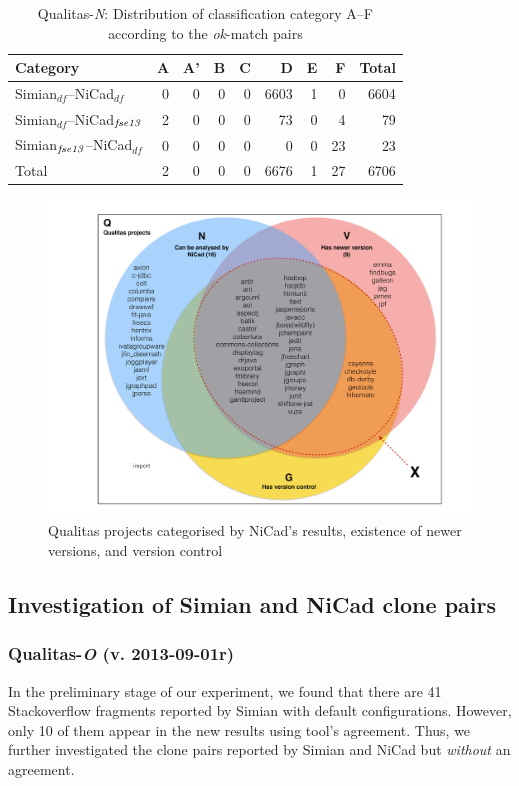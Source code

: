 \documentclass{IEEEtran}
\begin{document}
\begin{table}[H]
	\centering
	\caption{Qualitas-\textit{N}: Distribution of classification category A--F  according to the \textit{ok}-match pairs}
	\label{tab:ok_classification_new}
	\begin{tabular}{|l|r|r|r|r|r|r|r|r|}
		\hline 
		Category   																										& A   	& 	A' 	& 	B  & C	   & D   	&	E   &	F   & Total  \\
		\hline
		Simian$_{\mathrm{\textit{df}}}$--NiCad$_{\mathrm{\textit{df}}}$ & 0 & 0	& 0 & 0 & 6603 & 1 & 0 & 6604 \\
		Simian$_{\mathrm{\textit{df}}}$--NiCad$_{\textrm{\textit{fse13}}}$ 
		& 2 	& 0 	& 0 	& 0 	& 73 	 & 0 	  & 4 		&  79 \\
		Simian$_{\textrm{\textit{fse13}}}$--NiCad$_{\mathrm{\textit{df}}}$   									
		& 0 	& 0 	& 0 	& 0 	 & 0 	  & 0 		& 23 	& 23 \\
		\hline
		Total   & 2  	&   0   & 0   	&  0   &   6676   &   1   & 27  & 6706 \\
		\hline
	\end{tabular} 
\end{table}

\begin{figure}
	\centering
	\includegraphics[width=0.7\linewidth]{n+v+g}
	\caption{Qualitas projects categorised by NiCad's results, existence of newer versions, and version control}
	\label{fig:n+v+g}
\end{figure}

\subsection{Investigation of Simian and NiCad clone pairs}
\subsubsection{Qualitas-\textit{O} (v. 2013-09-01r)}
In the preliminary stage of our experiment, we found that there are 41 Stackoverflow fragments reported by Simian with default configurations. However, only 10 of them appear in the new results using tool's agreement. Thus, we further investigated the clone pairs reported by Simian and NiCad but \textit{without} an agreement. 
\end{document}
